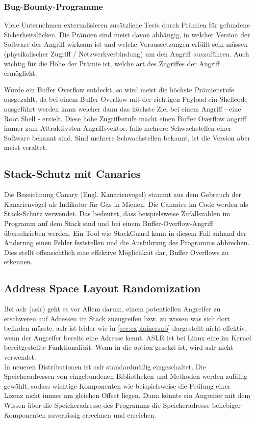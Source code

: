 \subsubsection{Bug-Bounty-Programme} \label{sec:bounties}
Viele Unternehmen externalisieren zusätzliche Tests durch Prämien für gefundene Sicherheitslücken.
Die Prämien sind meist davon abhängig, in welcher Version der Software der Angriff 
wirksam ist und welche Voraussetzungen erfüllt sein müssen (physikalischer Zugriff / Netzwerkverbindung)
um den Angriff auszuführen. Auch wichtig für die Höhe der Prämie ist, welche art des Zugriffes
der Angriff ermöglicht.

Wurde ein Buffer Overflow entdeckt, so wird meist die höchste Prämienstufe ausgezahlt, da bei einem
Buffer Overflow mit der richtigen Payload ein Shellcode ausgeführt werden kann welcher dann das
höchste Ziel bei einem Angriff - eine Root Shell - erzielt.
Diese hohe Zugriffsstufe macht einen Buffer Overflow angriff immer zum Attraktivsten Angriffsvektor,
falls mehrere Schwachstellen einer Software bekannt sind. Sind mehrere Schwachstellen bekannt, ist die
Version aber meist veraltet. 


\subsection{Stack-Schutz mit Canaries} \label{sec:canaries}
Die Bezeichnung Canary (Engl. Kanarienvogel) stammt aus dem Gebrauch der Kanarienvögel als
Indikator für Gas in Mienen. Die Canaries im Code werden als Stack-Schutz verwendet. Das bedeutet,
dass beispielsweise Zufallszahlen im Programm auf dem Stack sind und bei einem Buffer-Overflow-Angriff
überschrieben werden. Ein Tool wie StackGuard kann in diesem Fall anhand der Änderung einen Fehler feststellen und
die Ausführung des Programms abbrechen. Dies stellt offensichtlich eine effektive Möglichkeit dar,
Buffer Overflows zu erkennen. 

\subsection{Address Space Layout Randomization} \label{sec:aslr}
Bei \acrlong*{aslr} (\acrshort*{aslr}) geht es vor Allem darum, einem potentiellen Angreifer zu erschweren
auf Adressen im Stack zuzugreifen bzw. zu wissen was sich dort befinden müsste.
\gls*{aslr} ist leider wie in \autoref{sec:explainersub} dargestellt nicht effektiv, wenn der Angreifer
bereits eine Adresse kennt.
ASLR ist bei Linux eine im Kernel bereitgestellte Funktionalität.
Wenn in  die option  gesetzt ist,
wird \gls*{aslr}  nicht verwendet. \cite{aslrandrew} \\
In neueren Distributionen ist \gls*{aslr} standardmäßig eingeschaltet.
Die Speicheradressen von eingebundenen Bibliotheken und Methoden werden
zufällig gewählt, sodass wichtige Komponenten wie beispielsweise die
Prüfung einer Lizenz nicht immer am gleichen Offset liegen. Dann könnte ein Angreifer
mit dem Wissen über die Speicheradresse des Programms die Speicheradresse beliebiger
Komponenten zuverlässig errechnen und erreichen.

